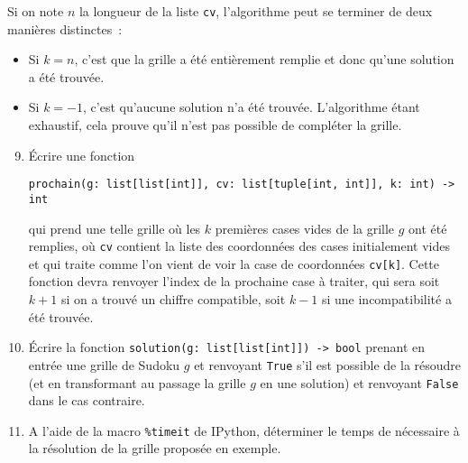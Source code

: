 \documentclass{magnolia}
\begin{document}
Si on note $n$ la longueur de la liste \verb!cv!, l'algorithme peut se terminer de deux
manières distinctes~:
\begin{itemize}
\item Si $k=n$, c'est que la grille a été entièrement remplie et donc qu'une solution a été trouvée.
\item Si $k=-1$, c'est qu'aucune solution n'a été trouvée. L'algorithme étant exhaustif,
  cela prouve qu'il n'est pas possible de compléter la grille.
\end{itemize}


\begin{enumerate}
\setcounter{enumi}{8}
\item Écrire une fonction
  \begin{center}
  \verb!prochain(g: list[list[int]], cv: list[tuple[int, int]], k: int) -> int!
  \end{center}
  qui prend une telle grille où les $k$ premières cases vides de la grille $g$ ont
  été remplies, où \verb!cv! contient la liste des coordonnées des cases
  initialement vides et qui traite comme l'on vient de voir la case
  de coordonnées \verb!cv[k]!. Cette fonction devra renvoyer l'index de la prochaine
  case à traiter, qui sera soit $k+1$ si on a trouvé un chiffre compatible, soit
  $k-1$ si une incompatibilité a été trouvée.
\item Écrire la fonction \verb!solution(g: list[list[int]]) -> bool!
  prenant en entrée une grille de Sudoku $g$ et renvoyant \verb!True! s'il est possible
  de la résoudre (et en transformant au passage la grille $g$ en une solution)
  et renvoyant \verb!False! dans le cas contraire.
\item A l'aide de la macro \verb!%timeit! de IPython, déterminer le temps de
  nécessaire à la résolution de la grille proposée en exemple.
\end{enumerate}








 
\end{document}

